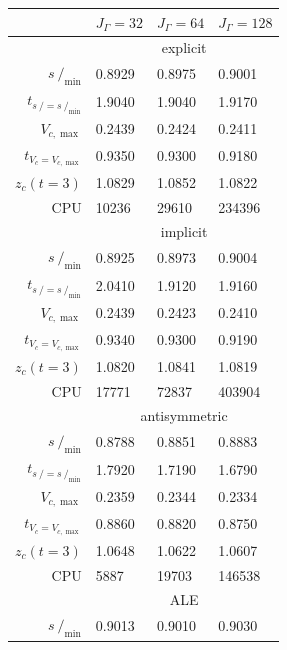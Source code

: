 \documentclass[a4paper,12pt,onecolumn]{article}
\newcommand{\strikes}{\mbox{$s\!\!\!\!\:/$}}
\begin{document}
\begin{table}
\center
\hspace*{-3.25cm}
\begin{tabular}{rlll}
\hline
 & $J_\Gamma=32$ & $J_\Gamma=64$ & $J_\Gamma=128$ \\
\hline
& \multicolumn{3}{c}{explicit} \\
\cmidrule{2-4}
$\strikes_{\min}$                & 0.8929 & 0.8975 & 0.9001 \\
$t_{\strikes = \strikes_{\min}}$ & 1.9040 & 1.9040 & 1.9170 \\
$V_{c,\max}$                     & 0.2439 & 0.2424 & 0.2411 \\
$t_{V_c = V_{c,\max}}$           & 0.9350 & 0.9300 & 0.9180 \\
$z_c(t=3)$                       & 1.0829 & 1.0852 & 1.0822 \\
CPU                              &  10236 &  29610 & 234396 \\
\cmidrule{2-4}
& \multicolumn{3}{c}{implicit} \\
\cmidrule{2-4}
$\strikes_{\min}$                & 0.8925 & 0.8973 & 0.9004 \\
$t_{\strikes = \strikes_{\min}}$ & 2.0410 & 1.9120 & 1.9160 \\
$V_{c,\max}$                     & 0.2439 & 0.2423 & 0.2410 \\
$t_{V_c = V_{c,\max}}$           & 0.9340 & 0.9300 & 0.9190 \\
$z_c(t=3)$                       & 1.0820 & 1.0841 & 1.0819 \\
CPU                              &  17771 &  72837 & 403904 \\
\cmidrule{2-4}
& \multicolumn{3}{c}{antisymmetric} \\
\cmidrule{2-4}
$\strikes_{\min}$                & 0.8788 & 0.8851 & 0.8883 \\
$t_{\strikes = \strikes_{\min}}$ & 1.7920 & 1.7190 & 1.6790 \\
$V_{c,\max}$                     & 0.2359 & 0.2344 & 0.2334 \\
$t_{V_c = V_{c,\max}}$           & 0.8860 & 0.8820 & 0.8750 \\
$z_c(t=3)$                       & 1.0648 & 1.0622 & 1.0607 \\
CPU                              &   5887 &  19703 & 146538 \\
\cmidrule{2-4}
& \multicolumn{3}{c}{ALE} \\
\cmidrule{2-4}
$\strikes_{\min}$                & 0.9013 & 0.9010 & 0.9030 \\

\end{tabular}
\end{table}
\end{document}
